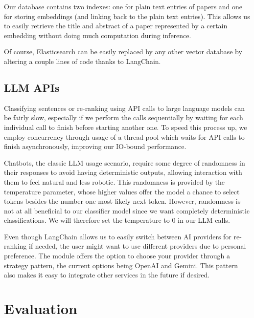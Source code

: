 \documentclass[12pt,a4paper]{report}
\begin{document}
Our database contains two indexes: one for plain text entries of papers and one for storing embeddings (and linking back to the plain text entries). This allows us to easily retrieve the title and abstract of a paper represented by a certain embedding without doing much computation during inference.

Of course, Elasticsearch can be easily replaced by any other vector database by altering a couple lines of code thanks to LangChain.

\section{LLM APIs}

Classifying sentences or re-ranking using API calls to large language models can be fairly slow, especially if we perform the calls sequentially by waiting for each individual call to finish before starting another one. To speed this process up, we employ concurrency through usage of a thread pool which waits for API calls to finish asynchronously, improving our IO-bound performance.

Chatbots, the classic LLM usage scenario, require some degree of randomness in their responses to avoid having deterministic outputs, allowing interaction with them to feel natural and less robotic. This randomness is provided by the temperature parameter, whose higher values offer the model a chance to select tokens besides the number one most likely next token. However, randomness is not at all beneficial to our classifier model since we want completely deterministic classifications. We will therefore set the temperature to 0 in our LLM calls.

Even though LangChain allows us to easily switch between AI providers for re-ranking if needed, the user might want to use different providers due to personal preference. The module offers the option to choose your provider through a strategy pattern, the current options being OpenAI and Gemini. This pattern also makes it easy to integrate other services in the future if desired.

\chapter{Evaluation} \label{evaluation}
\end{document}

